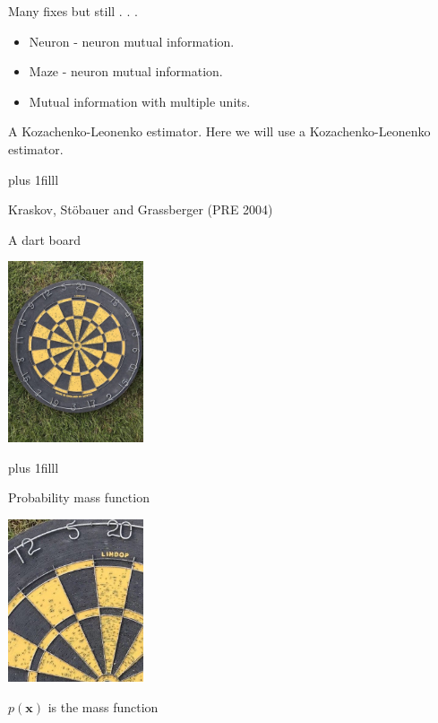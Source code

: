 \documentclass{beamer}
\newcommand{\btVFill}{\vskip0pt plus 1filll}
\begin{document}
\begin{frame}{Many fixes but still . . . }
\begin{itemize}
\item Neuron - neuron mutual information.
\item Maze - neuron mutual information.
\item Mutual information with multiple units.
\end{itemize}
\end{frame}


\begin{frame}{A Kozachenko-Leonenko estimator.}
\vskip 3cm
  Here we will use a Kozachenko-Leonenko estimator.

  \btVFill
  \begin{flushright}
    \color{gray}
    \tiny{Kraskov, St\"{o}bauer and Grassberger (PRE 2004)}
    \color{black}
\end{flushright}
\end{frame}


\begin{frame}{A dart board}
\color{reddish}
\begin{center}
\includegraphics[width=4cm]{dart_board.jpg}
\end{center}
\color{black}
\btVFill
\color{gray}
\color{black}
\end{frame}

\begin{frame}{Probability mass function}
\color{reddish}
\begin{center}
\includegraphics[width=4cm]{dart_board_zoom.png}
\end{center}
\begin{center}
\color{black}
$p(\mathbf{x})$ is the mass function
\end{center}
\color{black}
\end{frame}
\end{document}

